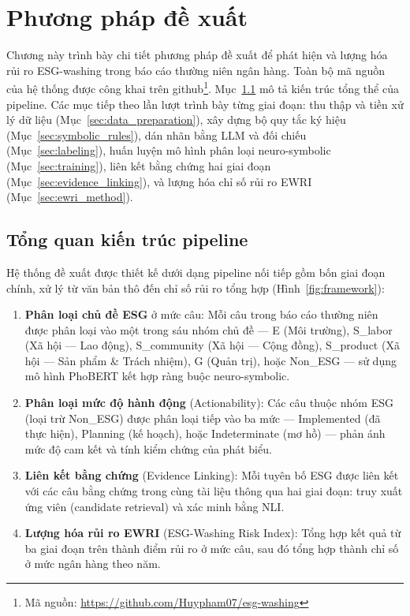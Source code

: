 \chapter{Phương pháp đề xuất}
\label{ch:method}
\setcounter{footnote}{0}

Chương này trình bày chi tiết phương pháp đề xuất để phát hiện và lượng hóa rủi ro ESG-washing trong báo cáo thường niên ngân hàng. Toàn bộ mã nguồn của hệ thống được công khai trên github\footnote{Mã nguồn: \url{https://github.com/Huypham07/esg-washing}}. Mục~\ref{sec:pipeline_overview} mô tả kiến trúc tổng thể của pipeline. Các mục tiếp theo lần lượt trình bày từng giai đoạn: thu thập và tiền xử lý dữ liệu (Mục~\ref{sec:data_preparation}), xây dựng bộ quy tắc ký hiệu (Mục~\ref{sec:symbolic_rules}), dán nhãn bằng LLM và đối chiếu (Mục~\ref{sec:labeling}), huấn luyện mô hình phân loại neuro-symbolic (Mục~\ref{sec:training}), liên kết bằng chứng hai giai đoạn (Mục~\ref{sec:evidence_linking}), và lượng hóa chỉ số rủi ro EWRI (Mục~\ref{sec:ewri_method}).


\section{Tổng quan kiến trúc pipeline}
\label{sec:pipeline_overview}

Hệ thống đề xuất được thiết kế dưới dạng pipeline nối tiếp gồm bốn giai đoạn chính, xử lý từ văn bản thô đến chỉ số rủi ro tổng hợp (Hình~\ref{fig:framework}):

\begin{enumerate}
    \item \textbf{Phân loại chủ đề ESG} ở mức câu: Mỗi câu trong báo cáo thường niên được phân loại vào một trong sáu nhóm chủ đề --- E (Môi trường), S\_labor (Xã hội --- Lao động), S\_community (Xã hội --- Cộng đồng), S\_product (Xã hội --- Sản phẩm \& Trách nhiệm), G (Quản trị), hoặc Non\_ESG --- sử dụng mô hình PhoBERT kết hợp ràng buộc neuro-symbolic.

    \item \textbf{Phân loại mức độ hành động} (Actionability): Các câu thuộc nhóm ESG (loại trừ Non\_ESG) được phân loại tiếp vào ba mức --- Implemented (đã thực hiện), Planning (kế hoạch), hoặc Indeterminate (mơ hồ) --- phản ánh mức độ cam kết và tính kiểm chứng của phát biểu.

    \item \textbf{Liên kết bằng chứng} (Evidence Linking): Mỗi tuyên bố ESG được liên kết với các câu bằng chứng trong cùng tài liệu thông qua hai giai đoạn: truy xuất ứng viên (candidate retrieval) và xác minh bằng NLI.

    \item \textbf{Lượng hóa rủi ro EWRI} (ESG-Washing Risk Index): Tổng hợp kết quả từ ba giai đoạn trên thành điểm rủi ro ở mức câu, sau đó tổng hợp thành chỉ số ở mức ngân hàng theo năm.
\end{enumerate}

